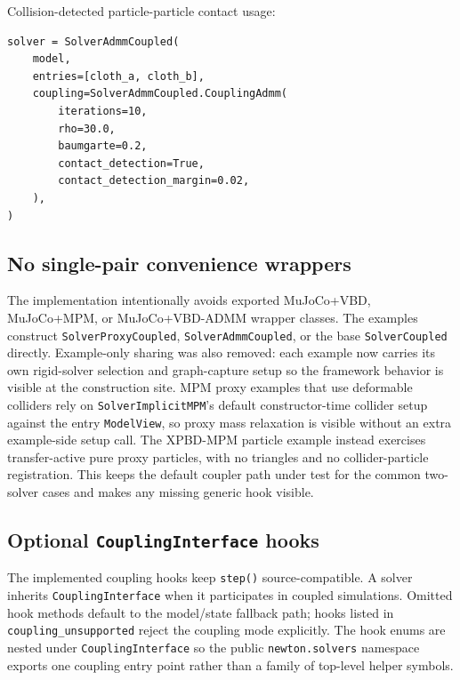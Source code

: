\documentclass[11pt]{article}
\begin{document}
Collision-detected particle-particle contact usage:
\begin{verbatim}
solver = SolverAdmmCoupled(
    model,
    entries=[cloth_a, cloth_b],
    coupling=SolverAdmmCoupled.CouplingAdmm(
        iterations=10,
        rho=30.0,
        baumgarte=0.2,
        contact_detection=True,
        contact_detection_margin=0.02,
    ),
)
\end{verbatim}

\subsection{No single-pair convenience wrappers}

The implementation intentionally avoids exported MuJoCo+VBD, MuJoCo+MPM, or
MuJoCo+VBD-ADMM wrapper classes. The examples construct
\texttt{SolverProxyCoupled}, \texttt{SolverAdmmCoupled}, or the base
\texttt{SolverCoupled} directly.  Example-only sharing was also removed: each
example now carries its own rigid-solver selection and graph-capture setup so
the framework behavior is visible at the construction site.  MPM proxy examples
that use deformable colliders rely on \texttt{SolverImplicitMPM}'s default
constructor-time collider setup against the entry \texttt{ModelView}, so proxy
mass relaxation is visible without an extra example-side setup call. The
XPBD-MPM particle example instead exercises transfer-active pure proxy particles,
with no triangles and no collider-particle registration. This keeps the default
coupler path under test for the common two-solver cases and makes any missing
generic hook visible.

\subsection{Optional \texttt{CouplingInterface} hooks}

The implemented coupling hooks keep \texttt{step()} source-compatible. A solver
inherits \texttt{CouplingInterface} when it participates in coupled simulations.
Omitted hook methods default to the model/state fallback path; hooks listed in
\texttt{coupling\_unsupported} reject the coupling mode explicitly. The hook
enums are nested under \texttt{CouplingInterface} so the public
\texttt{newton.solvers} namespace exports one coupling entry point rather than a
family of top-level helper symbols.
\end{document}
